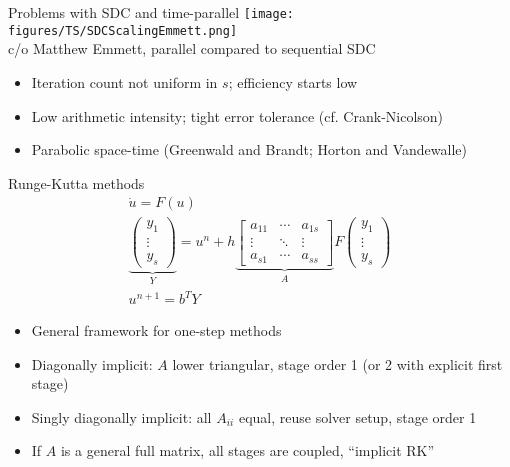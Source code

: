 \documentclass{beamer}
\begin{document}
\begin{frame}{Problems with SDC and time-parallel}
  \texttt{[image: figures/TS/SDCScalingEmmett.png]} \\
  c/o Matthew Emmett, parallel compared to sequential SDC
  \begin{itemize}
  \item Iteration count not uniform in $s$; efficiency starts low
  \item Low arithmetic intensity; tight error tolerance (cf. Crank-Nicolson)
  \item Parabolic space-time (Greenwald and Brandt; Horton and Vandewalle)
  \end{itemize}
\end{frame}

\begin{frame}{Runge-Kutta methods}
  \begin{gather*}
    \dot u = F(u) \\
    \underbrace{
    \begin{pmatrix}
      y_1 \\
      \vdots \\
      y_s
    \end{pmatrix}}_Y =
    u^{n} + h
    \underbrace{
    \begin{bmatrix}
      a_{11} & \dotsb & a_{1s} \\
      \vdots & \ddots & \vdots \\
      a_{s1} & \dotsb & a_{ss}
    \end{bmatrix}}_A
    F
    \begin{pmatrix}
      y_1 \\
      \vdots \\
      y_s
    \end{pmatrix} \\
    u^{n+1} = b^T Y
  \end{gather*}
  \begin{itemize}
  \item General framework for one-step methods
  \item Diagonally implicit: $A$ lower triangular, stage order 1 (or 2 with explicit first stage)
  \item Singly diagonally implicit: all $A_{ii}$ equal, reuse solver setup, stage order 1
  \item If $A$ is a general full matrix, all stages are coupled, ``implicit RK''
  \end{itemize}
\end{frame}
\end{document}

